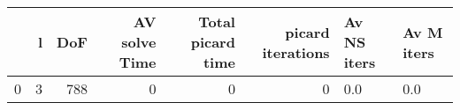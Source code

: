 \begin{tabular}{lrrrrrll}
\toprule
{} &  l &  DoF &  AV solve Time &  Total picard time &  picard iterations & Av NS iters & Av M iters \\
\midrule
0 &  3 &  788 &              0 &                  0 &                  0 &         0.0 &        0.0 \\
\bottomrule
\end{tabular}
